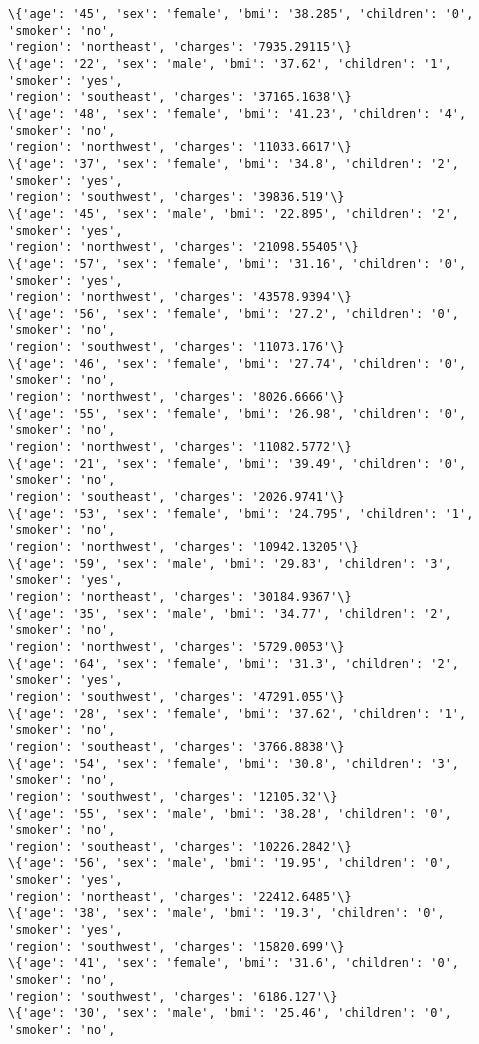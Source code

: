 \documentclass[11pt]{article}
\begin{document}
\begin{Verbatim}[commandchars=\\\{\}]
\{'age': '45', 'sex': 'female', 'bmi': '38.285', 'children': '0', 'smoker': 'no',
'region': 'northeast', 'charges': '7935.29115'\}
\{'age': '22', 'sex': 'male', 'bmi': '37.62', 'children': '1', 'smoker': 'yes',
'region': 'southeast', 'charges': '37165.1638'\}
\{'age': '48', 'sex': 'female', 'bmi': '41.23', 'children': '4', 'smoker': 'no',
'region': 'northwest', 'charges': '11033.6617'\}
\{'age': '37', 'sex': 'female', 'bmi': '34.8', 'children': '2', 'smoker': 'yes',
'region': 'southwest', 'charges': '39836.519'\}
\{'age': '45', 'sex': 'male', 'bmi': '22.895', 'children': '2', 'smoker': 'yes',
'region': 'northwest', 'charges': '21098.55405'\}
\{'age': '57', 'sex': 'female', 'bmi': '31.16', 'children': '0', 'smoker': 'yes',
'region': 'northwest', 'charges': '43578.9394'\}
\{'age': '56', 'sex': 'female', 'bmi': '27.2', 'children': '0', 'smoker': 'no',
'region': 'southwest', 'charges': '11073.176'\}
\{'age': '46', 'sex': 'female', 'bmi': '27.74', 'children': '0', 'smoker': 'no',
'region': 'northwest', 'charges': '8026.6666'\}
\{'age': '55', 'sex': 'female', 'bmi': '26.98', 'children': '0', 'smoker': 'no',
'region': 'northwest', 'charges': '11082.5772'\}
\{'age': '21', 'sex': 'female', 'bmi': '39.49', 'children': '0', 'smoker': 'no',
'region': 'southeast', 'charges': '2026.9741'\}
\{'age': '53', 'sex': 'female', 'bmi': '24.795', 'children': '1', 'smoker': 'no',
'region': 'northwest', 'charges': '10942.13205'\}
\{'age': '59', 'sex': 'male', 'bmi': '29.83', 'children': '3', 'smoker': 'yes',
'region': 'northeast', 'charges': '30184.9367'\}
\{'age': '35', 'sex': 'male', 'bmi': '34.77', 'children': '2', 'smoker': 'no',
'region': 'northwest', 'charges': '5729.0053'\}
\{'age': '64', 'sex': 'female', 'bmi': '31.3', 'children': '2', 'smoker': 'yes',
'region': 'southwest', 'charges': '47291.055'\}
\{'age': '28', 'sex': 'female', 'bmi': '37.62', 'children': '1', 'smoker': 'no',
'region': 'southeast', 'charges': '3766.8838'\}
\{'age': '54', 'sex': 'female', 'bmi': '30.8', 'children': '3', 'smoker': 'no',
'region': 'southwest', 'charges': '12105.32'\}
\{'age': '55', 'sex': 'male', 'bmi': '38.28', 'children': '0', 'smoker': 'no',
'region': 'southeast', 'charges': '10226.2842'\}
\{'age': '56', 'sex': 'male', 'bmi': '19.95', 'children': '0', 'smoker': 'yes',
'region': 'northeast', 'charges': '22412.6485'\}
\{'age': '38', 'sex': 'male', 'bmi': '19.3', 'children': '0', 'smoker': 'yes',
'region': 'southwest', 'charges': '15820.699'\}
\{'age': '41', 'sex': 'female', 'bmi': '31.6', 'children': '0', 'smoker': 'no',
'region': 'southwest', 'charges': '6186.127'\}
\{'age': '30', 'sex': 'male', 'bmi': '25.46', 'children': '0', 'smoker': 'no',

\end{Verbatim}
\end{document}
